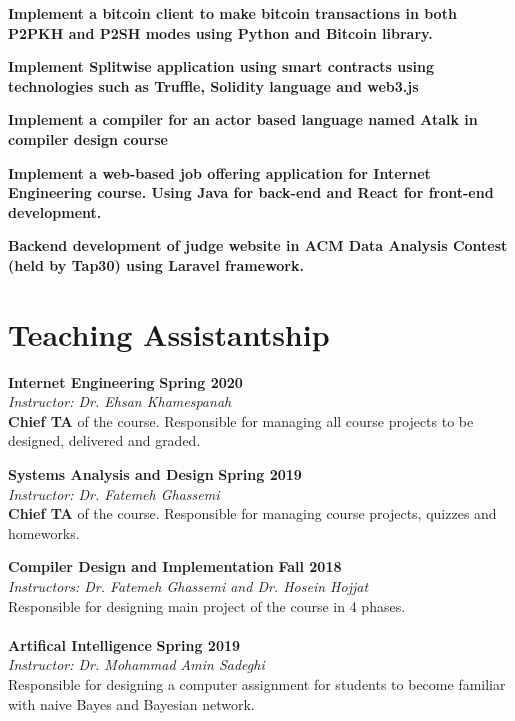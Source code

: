 \documentclass[line, mm]{sampleCV}
\begin{document}
\begin{resume}
\begin{list2}
\item \textbf {Implement a bitcoin client to make bitcoin transactions in both P2PKH and P2SH modes using Python and Bitcoin library.} 
\item \textbf {Implement Splitwise application using smart contracts using technologies such as Truffle, Solidity language and web3.js}
\item \textbf {Implement a compiler for an actor based language named Atalk in compiler design course} 
\item \textbf {Implement a web-based job offering application for Internet Engineering course. Using Java for back-end and React for front-end development.} 
\item \textbf{Backend development of judge website in ACM Data Analysis Contest (held by Tap30) using Laravel framework.}

\end{list2}

\section{\mysidestyle Teaching Assistantship}
\textbf{Internet Engineering} \hfill \textbf{Spring 2020}\\
{\it Instructor:  Dr. Ehsan Khamespanah}
\\
\textbf{Chief TA} of the course. Responsible for managing all course projects to be designed, delivered and graded.


\textbf{Systems Analysis and Design} \hfill \textbf{Spring 2019}\\
{\it Instructor:  Dr. Fatemeh Ghassemi}
\\
\textbf{Chief TA} of the course. Responsible for managing course projects, quizzes and homeworks.

\textbf{Compiler Design and Implementation} \hfill \textbf{Fall 2018}\\
{\it Instructors:  Dr. Fatemeh Ghassemi and Dr. Hosein Hojjat}\\
Responsible for designing main project of the course in 4 phases.\\ \\
\textbf{Artifical Intelligence} \hfill \textbf{Spring 2019}\\
{\it Instructor:  Dr. Mohammad Amin Sadeghi} \\
Responsible for designing a computer assignment for students to become familiar with naive Bayes and Bayesian network.


\end{resume}
\end{document}
